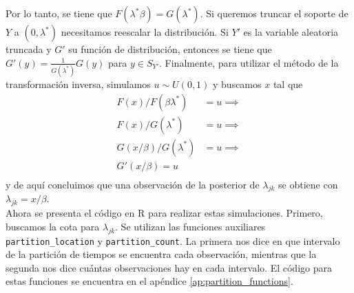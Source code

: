 \documentclass[11pt,a4paper]{article}
\begin{document}
Por lo tanto, se tiene que $F(\lambda^* \beta) = G(\lambda^*)$. Si queremos truncar el soporte de $Y$ a $(0, \lambda^*)$ necesitamos reescalar la distribución. Si $Y'$ es la variable aleatoria truncada y $G'$ su función de distribución, entonces se tiene que $G'(y) = \frac{1}{G(\lambda^*)} G(y)$ para $y \in S_{Y'}$. Finalmente, para utilizar el método de la transformación inversa, simulamos $u\sim U(0, 1)$ y buscamos $x$ tal que
\begin{align*}
F(x) / F(\beta \lambda^*) &= u \implies\\
F(x) / G(\lambda^*) &= u \implies\\
G(x/\beta) / G(\lambda^*) &= u \implies\\
G'(x/\beta) = u\\
\end{align*}
y de aquí concluimos que una observación de la posterior de $\lambda_{jk}$ se obtiene con $\lambda_{jk} = x/\beta$.\\

Ahora se presenta el código en R para realizar estas simulaciones. Primero, buscamos la cota para $\lambda_{jk}$. Se utilizan las funciones auxiliares \texttt{partition\_location} y \texttt{partition\_count}. La primera nos dice en que intervalo de la partición de tiempos se encuentra cada observación, mientras que la segunda nos dice cuántas observaciones hay en cada intervalo. El código para estas funciones se encuentra en el apéndice \ref{ap:partition_functions}.\\
\end{document}
